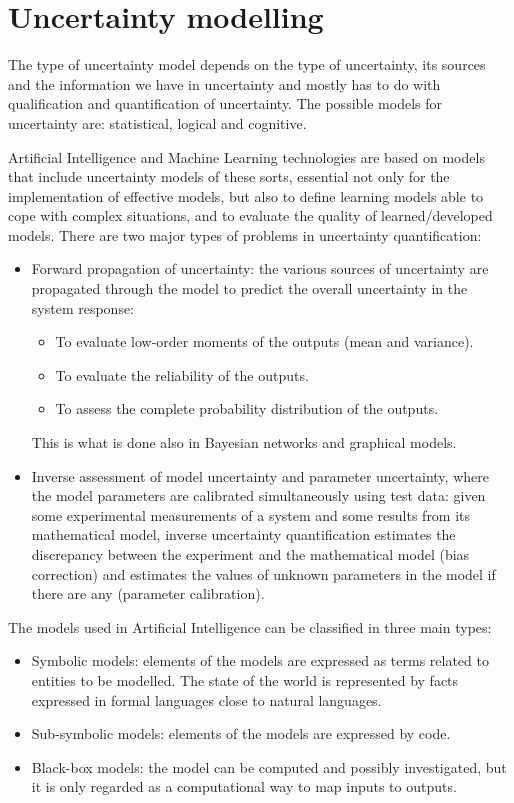\documentclass[12pt, a4paper]{report}
\begin{document}
    \section{Uncertainty modelling}
    The type of uncertainty model depends on the type of uncertainty, its sources and the information we have in uncertainty and mostly
    has to do with qualification and quantification of uncertainty. The possible models for uncertainty are: statistical, logical and
    cognitive.

    Artificial Intelligence and Machine Learning technologies are based on models that include uncertainty models of these sorts, essential
    not only for the implementation of effective models, but also to define learning models able to cope with complex situations, and 
    to evaluate the quality of learned/developed models. 
    There are two major types of problems in uncertainty quantification: 
    \begin{itemize}
        \item Forward propagation of uncertainty: the various sources of uncertainty are propagated through the model to predict the overall
            uncertainty in the system response:
            \begin{itemize}
                \item To evaluate low-order moments of the outputs (mean and variance).
                \item To evaluate the reliability of the outputs.
                \item To assess the complete probability distribution of the outputs. 
            \end{itemize}
            This is what is done also in Bayesian networks and graphical models. 
        \item Inverse assessment of model uncertainty and parameter uncertainty, where the model parameters are calibrated simultaneously
            using test data: given some experimental measurements of a system and some results from its mathematical model, inverse 
            uncertainty quantification estimates the discrepancy between the experiment and the mathematical model (bias correction) and
            estimates the values of unknown parameters in the model if there are any (parameter calibration).
    \end{itemize}
    The models used in Artificial Intelligence can be classified in three main types: 
    \begin{itemize}
        \item Symbolic models: elements of the models are expressed as terms related to entities to be modelled. The state of the world is
            represented by facts expressed in formal languages close to natural languages.
        \item Sub-symbolic models: elements of the models are expressed by code. 
        \item Black-box models: the model can be computed and possibly investigated, but it is only regarded as a computational way to map
            inputs to outputs. 
    \end{itemize}
\end{document}
